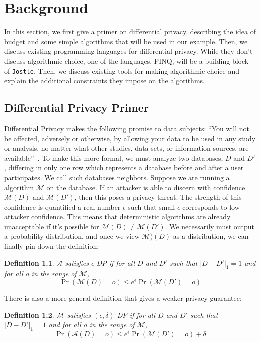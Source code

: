 \documentclass[11pt]{report}
\newtheorem{defn}{Definition}
\newcommand{\Jostle}{\texttt{Jostle}}
\begin{document}
\chapter{Background}\label{ch:background}
In this section, we first give a primer on differential privacy, describing the idea of budget and some simple algorithms that will be used in our example. Then, we discuss existing programming languages for differential privacy. While they don't discuss algorithmic choice, one of the languages, PINQ, will be a building block of \Jostle{}. Then, we discuss existing tools for making algorithmic choice and explain the additional constraints they impose on the algorithms.

\section{Differential Privacy Primer}
Differential Privacy makes the following promise to data subjects: ``You will not be affected, adversely or otherwise, by allowing your data to be used in any study or analysis, no matter what other studies, data sets, or information sources, are available''~\cite{Dwork:2006}. To make this more formal, we must analyze two databases, $D$ and $D'$, differing in only one row which represents a database before and after a user participates. We call such databases neighbors. Suppose we are running a algorithm $\mathcal{M}$ on the database. If an attacker is able to discern with confidence $\mathcal{M}(D)$ and $\mathcal{M}(D')$, then this poses a privacy threat. The strength of this confidence is quantified a real number $\epsilon$ such that small $\epsilon$ corresponds to low attacker confidence. This means that deterministic algorithms are already unacceptable if it's possible for $\mathcal{M}(D) \neq \mathcal{M}(D')$. We necessarily must output a probability distribution, and once we view $\mathcal{M})(D)$ as a distribution, we can finally pin down the definition:

\begin{defn}
$\mathcal{A}$ satisfies $\epsilon$-DP if for all $D$ and $D'$ such that $|D-D'|_1=1$ and for all $o$ in the range of $\mathcal{M}$, 
\[\Pr\left(\mathcal{M}(D) = o \right) \leq e^{\epsilon} \Pr\left(\mathcal{M}(D')=o\right)\]
\end{defn}

There is also a more general definition that gives a weaker privacy guarantee: 

\begin{defn}
$\mathcal{M}$ satisfies $(\epsilon, \delta)$-DP if for all $D$ and $D'$ such that $|D-D'|_1=1$ and for all $o$ in the range of $\mathcal{M}$, 
\[\Pr\left(\mathcal{A}(D) = o \right) \leq e^{\epsilon} \Pr\left(\mathcal{M}(D')=o \right) + \delta\]
\end{defn}
\end{document}
